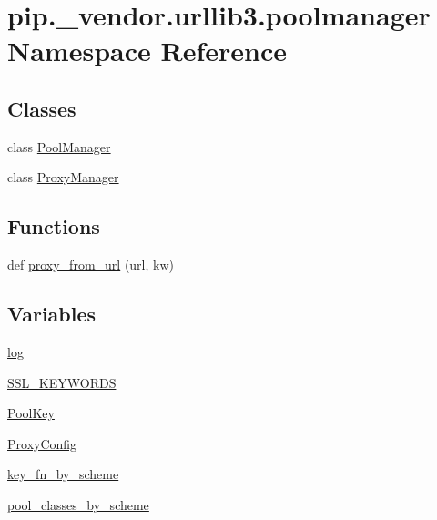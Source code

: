 \hypertarget{namespacepip_1_1__vendor_1_1urllib3_1_1poolmanager}{}\section{pip.\+\_\+vendor.\+urllib3.\+poolmanager Namespace Reference}
\label{namespacepip_1_1__vendor_1_1urllib3_1_1poolmanager}
\subsection*{Classes}
\begin{DoxyCompactItemize}
\item 
class \hyperlink{classpip_1_1__vendor_1_1urllib3_1_1poolmanager_1_1PoolManager}{Pool\+Manager}
\item 
class \hyperlink{classpip_1_1__vendor_1_1urllib3_1_1poolmanager_1_1ProxyManager}{Proxy\+Manager}
\end{DoxyCompactItemize}
\subsection*{Functions}
\begin{DoxyCompactItemize}
\item 
def \hyperlink{namespacepip_1_1__vendor_1_1urllib3_1_1poolmanager_ae4034e4a3d9b5f203de3c23ce54cb321}{proxy\+\_\+from\+\_\+url} (url, kw)
\end{DoxyCompactItemize}
\subsection*{Variables}
\begin{DoxyCompactItemize}
\item 
\hyperlink{namespacepip_1_1__vendor_1_1urllib3_1_1poolmanager_af5f229da4ceb3f6f78fb35d134449a3f}{log}
\item 
\hyperlink{namespacepip_1_1__vendor_1_1urllib3_1_1poolmanager_af52abf835740a24d550208a314059840}{S\+S\+L\+\_\+\+K\+E\+Y\+W\+O\+R\+DS}
\item 
\hyperlink{namespacepip_1_1__vendor_1_1urllib3_1_1poolmanager_ae231f25ce869337aa3bc4a70de7ffd6a}{Pool\+Key}
\item 
\hyperlink{namespacepip_1_1__vendor_1_1urllib3_1_1poolmanager_a86799b39460e7e60e5de494d6d6845bb}{Proxy\+Config}
\item 
\hyperlink{namespacepip_1_1__vendor_1_1urllib3_1_1poolmanager_a783f41d2b258238489dfcdd570da9808}{key\+\_\+fn\+\_\+by\+\_\+scheme}
\item 
\hyperlink{namespacepip_1_1__vendor_1_1urllib3_1_1poolmanager_a28c772e8cbbfcc1e3d0bf082ec343cfe}{pool\+\_\+classes\+\_\+by\+\_\+scheme}
\end{DoxyCompactItemize}


